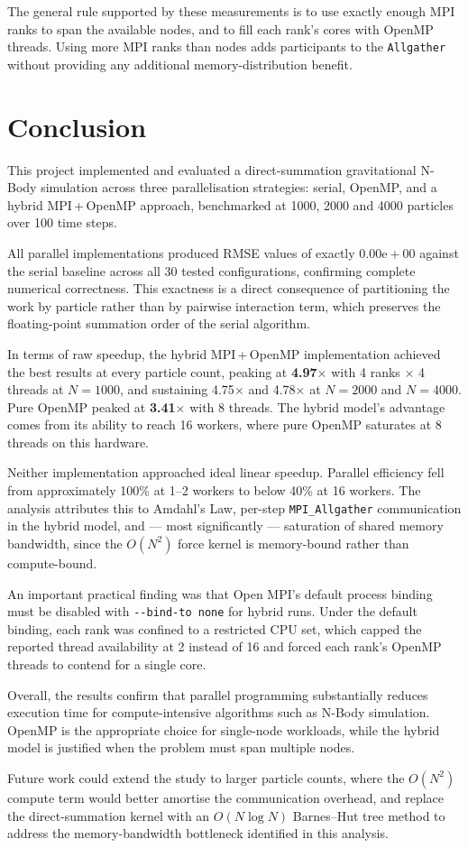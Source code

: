 \documentclass[11pt,a4paper]{article}
\begin{document}
The general rule supported by these measurements is to use exactly enough MPI
ranks to span the available nodes, and to fill each rank's cores with OpenMP
threads. Using more MPI ranks than nodes adds participants to the
\texttt{Allgather} without providing any additional memory-distribution
benefit.

\section{Conclusion}

This project implemented and evaluated a direct-summation gravitational N-Body
simulation across three parallelisation strategies: serial, OpenMP, and a
hybrid MPI\,+\,OpenMP approach, benchmarked at 1000, 2000 and 4000 particles
over 100 time steps.

All parallel implementations produced RMSE values of exactly
$0.00\mathrm{e}{+}00$ against the serial baseline across all 30 tested
configurations, confirming complete numerical correctness. This exactness is a
direct consequence of partitioning the work by particle rather than by
pairwise interaction term, which preserves the floating-point summation order
of the serial algorithm.

In terms of raw speedup, the hybrid MPI\,+\,OpenMP implementation achieved the
best results at every particle count, peaking at \textbf{4.97$\times$} with 4
ranks $\times$ 4 threads at $N=1000$, and sustaining 4.75$\times$ and
4.78$\times$ at $N=2000$ and $N=4000$. Pure OpenMP peaked at
\textbf{3.41$\times$} with 8 threads. The hybrid model's advantage comes from
its ability to reach 16 workers, where pure OpenMP saturates at 8 threads on
this hardware.

Neither implementation approached ideal linear speedup. Parallel efficiency
fell from approximately 100\% at 1--2 workers to below 40\% at 16 workers. The
analysis attributes this to Amdahl's Law, per-step \texttt{MPI\_Allgather}
communication in the hybrid model, and --- most significantly --- saturation of
shared memory bandwidth, since the $O(N^2)$ force kernel is memory-bound rather
than compute-bound.

An important practical finding was that Open MPI's default process binding must
be disabled with \texttt{-{}-bind-to none} for hybrid runs. Under the default
binding, each rank was confined to a restricted CPU set, which capped the
reported thread availability at 2 instead of 16 and forced each rank's OpenMP
threads to contend for a single core.

Overall, the results confirm that parallel programming substantially reduces
execution time for compute-intensive algorithms such as N-Body simulation.
OpenMP is the appropriate choice for single-node workloads, while the hybrid
model is justified when the problem must span multiple nodes.

Future work could extend the study to larger particle counts, where the
$O(N^2)$ compute term would better amortise the communication overhead, and
replace the direct-summation kernel with an $O(N \log N)$ Barnes--Hut tree
method to address the memory-bandwidth bottleneck identified in this analysis.
\end{document}
